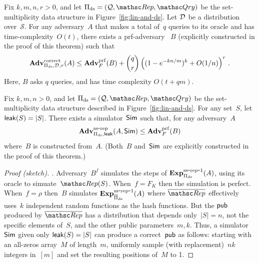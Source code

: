 \begin{theorem}\label{thm2}
Fix $k,m,n,r>0$, and let $\Pi_{\mathrm{ds}}= (\calQ,\Rep, \Qry)$ be the set-multiplicity data structure in Figure~\ref{fig:lin-and-ds}. Let $\mathcal{D}_{}^{}$ be a distribution over~$\mathcal{S}$.  For any adversary~$A$ that makes a total of~$q$ queries to its oracle and has time-complexity~$O(t)$, there exists a prf-adversary ~$B$ (explicitly constructed in the proof of this theorem) such that
\[
\mathrm{\mathbf{Adv}}^{\mathrm{correct}}_{\Pi_{\mathrm{ds}},\mathcal{D}_{}^{},r}(A) \leq  \mathbf{Adv}^{\mathrm{prf}}_{F}(B)  + {\dbinom{q}{r}} \left( (1-e^{-kn/m})^k + O(1/n) \right)^r\,.
\]
Here, $B$ asks $q$ queries, and has time complexity $O(t+qm)$.
\end{theorem}

\begin{theorem}
Fix $k,m,n>0$, and let $\Pi_{\mathrm{ds}}= (\calQ,\Rep, \Qry)$ be the set-multiplicity data structure described in Figure~\ref{fig:lin-and-ds}.  For any set~$S$, let ${\sf leak}(S)=|S|$.  There exists a simulator~${\sf Sim}$ such that, for any adversary~$A$ 
\[
\mathrm{\mathbf{Adv}}^{\mathrm{ss\mbox{-}rep}}_{\Pi_{\mathrm{ds}},{\sf leak}}(A,{\sf Sim}) \leq  \mathbf{Adv}^{\mathrm{prf}}_{F}(B)
\]
where~$B$ is constructed from~$A$.  (Both~$B$ and~${\sf Sim}$ are explicitly constructed in the proof of this theorem.) 
\end{theorem}
\begin{proof}[Proof (sketch). ]
Adversary~$B^{f}$ simulates the steps of $\mathrm{\mathbf{Exp}}^{\mathrm{ss\mbox{-}rep\mbox{-}1}}_{\Pi_{\mathrm{ds}}}(A)$, using its oracle to simuate~$\Rep(S)$.  When~$f=F_K$ then the simulation is perfect.  When~$f=\rho$ then~$B$ simulates $\mathrm{\mathbf{Exp}}^{\mathrm{ss\mbox{-}rep\mbox{-}1}}_{\overline{\Pi}_{\mathrm{ds}}}(A)$ where $\overline{\Rep}$ effectively uses~$k$ independent random functions as the hash functions.  But the ${\sf pub}$ produced by $\overline{\Rep}$ has a distribution that depends only~$|S|=n$, not the specific elements of~$S$, and the other public parameters~$m,k$.  Thus, a simulator~${\sf Sim}$ given only ${\sf leak}(S)=|S|$ can produce a correct~${\sf pub}$ as follows: starting with an all-zeros array~$M$ of length~$m$, uniformly sample (with replacement)~$nk$ integers in~$[m]$ and set the resulting positions of~$M$ to 1.
\end{proof}



